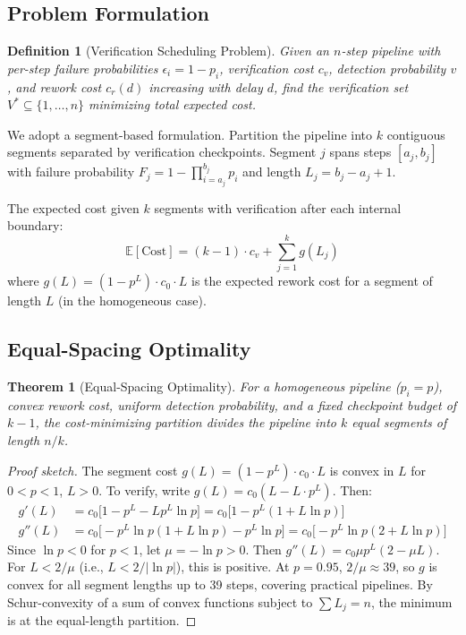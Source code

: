 \documentclass[11pt, a4paper, copyright]{googledeepmind}
\newtheorem{definition}{Definition}[section]
\newtheorem{theorem}{Theorem}[section]
\newcommand{\E}{\mathbb{E}}
\begin{document}
\subsection{Problem Formulation}

\begin{definition}[Verification Scheduling Problem]
Given an $n$-step pipeline with per-step failure probabilities $\epsilon_i = 1 - p_i$, verification cost $c_v$, detection probability $v$, and rework cost $c_r(d)$ increasing with delay $d$, find the verification set $V^* \subseteq \{1, \ldots, n\}$ minimizing total expected cost.
\end{definition}

We adopt a segment-based formulation.
Partition the pipeline into $k$ contiguous segments separated by verification checkpoints.
Segment $j$ spans steps $[a_j, b_j]$ with failure probability $F_j = 1 - \prod_{i=a_j}^{b_j} p_i$ and length $L_j = b_j - a_j + 1$.

The expected cost given $k$ segments with verification after each internal boundary:
\begin{equation}
\E[\text{Cost}] = (k-1) \cdot c_v + \sum_{j=1}^{k} g(L_j)
\end{equation}
where $g(L) = (1 - p^L) \cdot c_0 \cdot L$ is the expected rework cost for a segment of length $L$ (in the homogeneous case).

\subsection{Equal-Spacing Optimality}

\begin{theorem}[Equal-Spacing Optimality]
\label{thm:equalspacing}
For a homogeneous pipeline ($p_i = p$), convex rework cost, uniform detection probability, and a fixed checkpoint budget of $k-1$, the cost-minimizing partition divides the pipeline into $k$ equal segments of length $n/k$.
\end{theorem}

\begin{proof}[Proof sketch]
The segment cost $g(L) = (1 - p^L) \cdot c_0 \cdot L$ is convex in $L$ for $0 < p < 1$, $L > 0$.
To verify, write $g(L) = c_0(L - L \cdot p^L)$. Then:
\begin{align*}
g'(L) &= c_0\bigl[1 - p^L - L p^L \ln p\bigr] = c_0\bigl[1 - p^L(1 + L\ln p)\bigr]\\
g''(L) &= c_0\bigl[-p^L \ln p(1 + L\ln p) - p^L \ln p\bigr] = c_0\bigl[-p^L \ln p(2 + L\ln p)\bigr]
\end{align*}
Since $\ln p < 0$ for $p < 1$, let $\mu = -\ln p > 0$. Then $g''(L) = c_0 \mu p^L(2 - \mu L)$.
For $L < 2/\mu$ (i.e., $L < 2/|\ln p|$), this is positive.
At $p = 0.95$, $2/\mu \approx 39$, so $g$ is convex for all segment lengths up to 39 steps, covering practical pipelines.
By Schur-convexity of a sum of convex functions subject to $\sum L_j = n$, the minimum is at the equal-length partition.
\end{proof}
\end{document}
